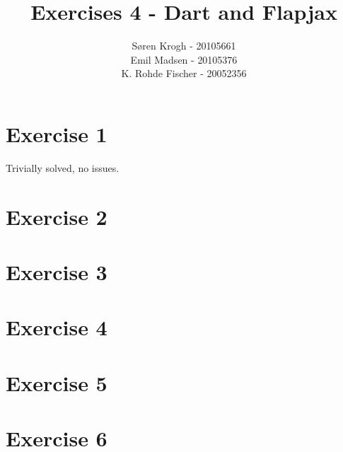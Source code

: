 \documentclass[a4paper,10pt]{article}
\author{
Søren Krogh -  20105661 \\
Emil Madsen - 20105376  \\
K. Rohde Fischer - 20052356\\}
\title{Exercises 4 - Dart and Flapjax}
\begin{document}
\maketitle

\section*{Exercise 1}
Trivially solved, no issues.

\section*{Exercise 2}


\section*{Exercise 3}

\section*{Exercise 4}


\section*{Exercise 5}


\section*{Exercise 6}
\end{document}
